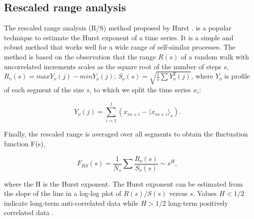\subsection{Rescaled range analysis} 

The rescaled range analysis (R/S) method proposed by Hurst \cite{hurst1951long}. is a popular technique to estimate the Hurst exponent of a time series. It is a simple and robust method that works well for a wide range of self-similar processes. The method is based on the observation that the range $R(s)$ of a random walk with uncorrelated increments scales as the square root of the number of steps $s$, 
$R_{\nu}(s) = max Y_\nu(j) - min Y_{\nu}(j)$; $S_{\nu}(s) = \sqrt{\frac{1}{s}\sum Y^2_{\nu}(j)}$, where $Y_\nu$ is profile of each segment of the size $s$, to which we split the time series $x_i$:

$$Y_\nu(j) = \sum_{i=1}^{j} (x_{\nu s +i} - \langle x_{\nu s + i } \rangle _s).$$

Finally, the rescaled range is averaged over all segments to obtain the fluctuation function F(s),

$$F_{RS}(s) = \frac{1}{N_s}\sum \frac{R_{\nu}(s)}{S_{\nu}(s)} \sim s^H,$$

where the H is the Hurst exponent. The Hurst exponent can be estimated from the slope of the line in a log-log plot of $R(s)/S(s)$ versus $s$. Values $H<1/2$ indicate long-term anti-correlated data while $H>1/2$ long-term positively correlated data \cite{kantelhardt2008fractal}. 











